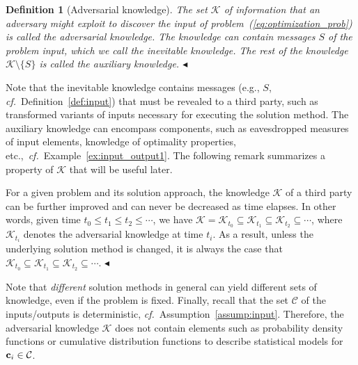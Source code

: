\documentclass[12pt,draftcls,onecolumn]{IEEEtran}
\newtheorem{defin}{Definition}\newtheorem{assump}{Assumption}
\newcommand{\cf}{{\textit{cf.}}}
\renewcommand{\vec}[1]{\bf{#1}}     \newcommand{\vecsc}[1]{\mbox {\boldmath \scriptsize $#1$}}     \newcommand{\itvec}[1]{\mbox {\boldmath $#1$}}
\newcommand{\addnew}[1]{{{\color{blue!0!black}#1}}}
\begin{document}
\addnew{
\begin{defin}[Adversarial knowledge]\label{def:AdvsryKnowledge}
The set $\mathcal{K}$ of information that an adversary might exploit to discover the input of problem~(\ref{eq:optimization_prob}) is called the adversarial knowledge. The knowledge can contain messages $S$ of the problem input, which we call the \emph{inevitable} knowledge. The rest of the knowledge $\mathcal{K}\setminus\{S\}$ is called the \emph{auxiliary} knowledge. \hfill $\blacktriangleleft$
\end{defin}
}

\addnew{
Note that the inevitable knowledge contains messages (e.g., $S$, \cf~Definition~\ref{def:input}) that must be revealed to a third party, such as transformed variants of inputs necessary for executing the solution method. The auxiliary knowledge can encompass components, such as eavesdropped measures of input elements, knowledge of optimality properties, etc.,~\cf~Example~\ref{ex:input_output1}. The following remark summarizes a property of $\mathcal{K}$ that will be useful later.

\begin{remark}\label{remark:knowledge}
For a given problem and its solution approach, the knowledge $\mathcal{K}$ of a third party can be further improved and can never be decreased as time elapses. In other words, given time $t_0\leq t_1\leq t_2\leq \cdots$, we have $\mathcal{K}=\mathcal{K}_{t_0}\subseteq\mathcal{K}_{t_1}\subseteq\mathcal{K}_{t_2}\subseteq\cdots$, where $\mathcal{K}_{t_i}$ denotes the adversarial knowledge at time $t_i$. As a result, unless the underlying solution method is changed, it is always the case that $\mathcal{K}_{t_0}\subseteq\mathcal{K}_{t_1}\subseteq\mathcal{K}_{t_2}\subseteq\cdots$. \hfill $\blacktriangleleft$
\end{remark}

Note that \emph{different} solution methods in general can yield different sets of knowledge, even if the problem is fixed. Finally, recall that the set $\mathcal{C}$ of the inputs/outputs is deterministic, \cf~Assumption~\ref{assump:input}. Therefore, the adversarial knowledge $\mathcal{K}$ does not contain elements such as probability density functions or cumulative distribution functions to describe statistical models for ${\vec c}_i\in\mathcal{C}$.}
\end{document}
